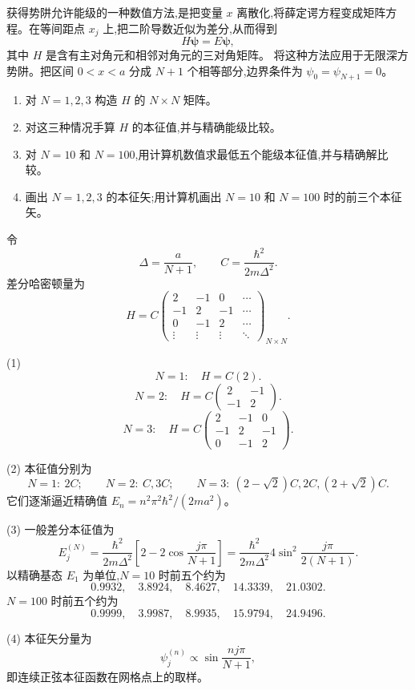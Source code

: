 \begin{question}
获得势阱允许能级的一种数值方法,是把变量 $x$ 离散化,将薛定谔方程变成矩阵方程。在等间距点 $x_j$ 上,把二阶导数近似为差分,从而得到
\[
H\mathbf{\psi}=E\mathbf{\psi},
\]
其中 $H$ 是含有主对角元和相邻对角元的三对角矩阵。
将这种方法应用于无限深方势阱。把区间 $0<x<a$ 分成 $N+1$ 个相等部分,边界条件为 $\psi_0=\psi_{N+1}=0$。
\begin{enumerate}
\item 对 $N=1,2,3$ 构造 $H$ 的 $N\times N$ 矩阵。
\item 对这三种情况手算 $H$ 的本征值,并与精确能级比较。
\item 对 $N=10$ 和 $N=100$,用计算机数值求最低五个能级本征值,并与精确解比较。
\item 画出 $N=1,2,3$ 的本征矢;用计算机画出 $N=10$ 和 $N=100$ 时的前三个本征矢。
\end{enumerate}
\begin{solution}
令
\[
\Delta=\frac{a}{N+1},
\qquad
C=\frac{\hbar^2}{2m\Delta^2}.
\]
差分哈密顿量为
\[
H=C\begin{pmatrix}
2&-1&0&\cdots\\
-1&2&-1&\cdots\\
0&-1&2&\cdots\\
\vdots&\vdots&\vdots&\ddots
\end{pmatrix}_{N\times N}.
\]

(1) 
\[
N=1:\quad H=C(2).
\]
\[
N=2:\quad H=C\begin{pmatrix}2&-1\\-1&2\end{pmatrix}.
\]
\[
N=3:\quad H=C\begin{pmatrix}2&-1&0\\-1&2&-1\\0&-1&2\end{pmatrix}.
\]

(2) 本征值分别为
\[
N=1:\ 2C;
\qquad
N=2:\ C,3C;
\qquad
N=3:\ (2-\sqrt2)C,2C,(2+\sqrt2)C.
\]
它们逐渐逼近精确值 $E_n=n^2\pi^2\hbar^2/(2ma^2)$。

(3) 一般差分本征值为
\[
E_j^{(N)}=\frac{\hbar^2}{2m\Delta^2}
\left[2-2\cos\frac{j\pi}{N+1}\right]
=\frac{\hbar^2}{2m\Delta^2}4\sin^2\frac{j\pi}{2(N+1)}.
\]
以精确基态 $E_1$ 为单位,$N=10$ 时前五个约为
\[
0.9932,
\quad 3.8924,
\quad 8.4627,
\quad 14.3339,
\quad 21.0302.
\]
$N=100$ 时前五个约为
\[
0.9999,
\quad 3.9987,
\quad 8.9935,
\quad 15.9794,
\quad 24.9496.
\]

(4) 本征矢分量为
\[
\psi_j^{(n)}\propto \sin\frac{nj\pi}{N+1},
\]
即连续正弦本征函数在网格点上的取样。
\end{solution}
\end{question}

